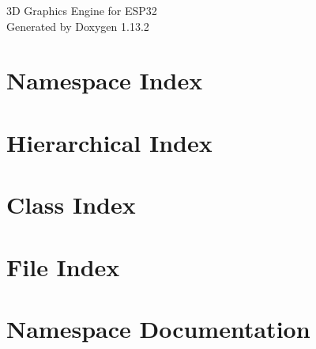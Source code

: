 \documentclass[twoside]{book}
\newcommand{\+}{\discretionary{\mbox{\scriptsize$\hookleftarrow$}}{}{}}
\newcommand{\clearemptydoublepage}{%
    \newpage{\pagestyle{empty}\cleardoublepage}%
  }
\begin{document}
  \raggedbottom
    \hypersetup{pageanchor=false,
                bookmarksnumbered=true,
                pdfencoding=unicode
               }
  \begin{titlepage}
  \vspace*{7cm}
  \begin{center}%
  {\Large 3\+D Graphics Engine for ESP32}\\
  \vspace*{1cm}
  {\large Generated by Doxygen 1.13.2}\\
  \end{center}
  \end{titlepage}
  \clearemptydoublepage
  \tableofcontents
  \clearemptydoublepage
  \hypersetup{pageanchor=true}
\chapter{Namespace Index}

\chapter{Hierarchical Index}

\chapter{Class Index}

\chapter{File Index}

\chapter{Namespace Documentation}



\end{document}
